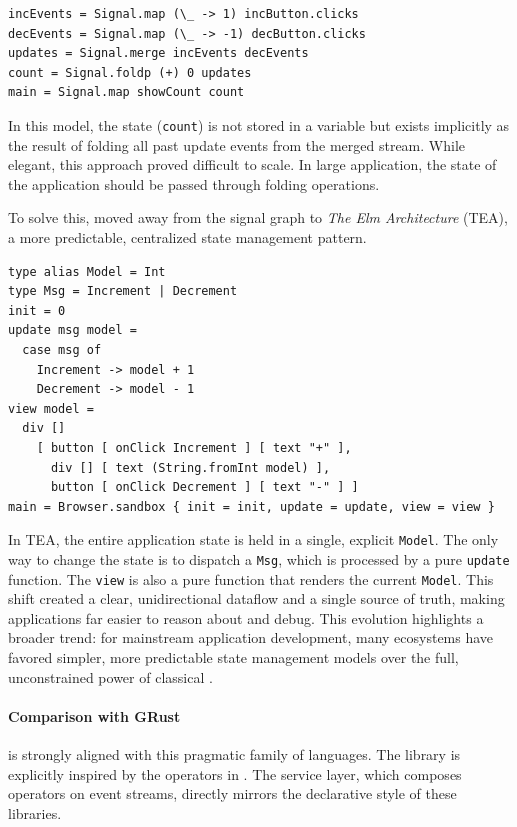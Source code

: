 \begin{lstlisting}[basicstyle=\ttfamily\footnotesize\color{BlackText}]
incEvents = Signal.map (\_ -> 1) incButton.clicks
decEvents = Signal.map (\_ -> -1) decButton.clicks
updates = Signal.merge incEvents decEvents
count = Signal.foldp (+) 0 updates
main = Signal.map showCount count
\end{lstlisting}

In this model, the state (\texttt{count}) is not stored in a variable but exists implicitly as the
result of folding all past update events from the merged stream. While elegant, this approach proved
difficult to scale. In large application, the state of the application should be passed through
folding operations.

To solve this, \Elm moved away from the signal graph to \emph{The {Elm} Architecture}
(TEA), a more predictable, centralized state management pattern.

\begin{lstlisting}[basicstyle=\ttfamily\footnotesize\color{BlackText}]
type alias Model = Int
type Msg = Increment | Decrement
init = 0
update msg model =
  case msg of
    Increment -> model + 1
    Decrement -> model - 1
view model =
  div []
    [ button [ onClick Increment ] [ text "+" ],
      div [] [ text (String.fromInt model) ],
      button [ onClick Decrement ] [ text "-" ] ]
main = Browser.sandbox { init = init, update = update, view = view }
\end{lstlisting}

In TEA, the entire application state is held in a single, explicit \texttt{Model}. The only way to
change the state is to dispatch a \texttt{Msg}, which is processed by a pure \texttt{update}
function. The \texttt{view} is also a pure function that renders the current \texttt{Model}. This
shift created a clear, unidirectional dataflow and a single source of truth, making applications far
easier to reason about and debug. This evolution highlights a broader trend: for mainstream
application development, many ecosystems have favored simpler, more predictable state management
models over the full, unconstrained power of classical \frp.

\paragraph*{Comparison with GRust}
\GRust is strongly aligned with this pragmatic family of languages. The \GReact library is
explicitly inspired by the operators in \ReactiveX. The \GRFRP service layer, which composes
operators on event streams, directly mirrors the declarative style of these libraries.

